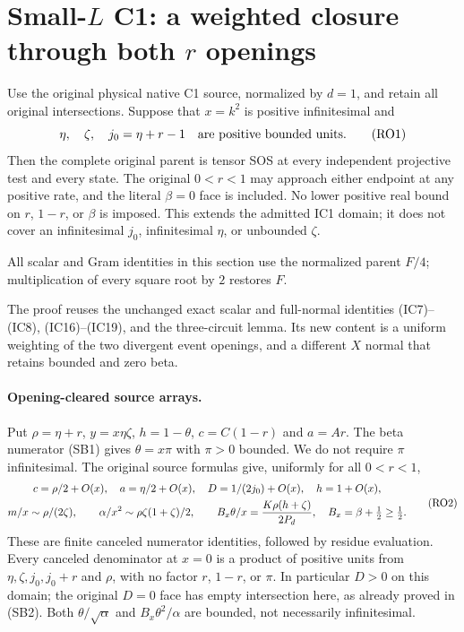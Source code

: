 \section{Small-$L$ C1: a weighted closure through both $r$ openings}
\label{sec:r13-c1-r-openings}

\begin{theorem}
Use the original physical native C1 source, normalized by $d=1$, and
retain all original intersections. Suppose that $x=k^2$ is positive
infinitesimal and
\[
 \eta,\quad\zeta,\quad j_0=\eta+r-1
       \quad\hbox{are positive bounded units}.                 \tag{RO1}
\]
Then the complete original parent is tensor SOS at every independent
projective test and every state. The original $0<r<1$ may approach
either endpoint at any positive rate, and the literal $\beta=0$ face
is included. No lower positive real bound on $r$, $1-r$, or $\beta$
is imposed. This extends the admitted IC1 domain; it does
not cover an infinitesimal $j_0$, infinitesimal $\eta$, or unbounded
$\zeta$.
\end{theorem}

All scalar and Gram identities in this section use the normalized
parent $F/4$; multiplication of every square root by $2$ restores $F$.

The proof reuses the unchanged exact scalar and full-normal identities
(IC7)--(IC8), (IC16)--(IC19), and the three-circuit lemma. Its new
content is a uniform weighting of the two divergent event openings,
and a different $X$ normal that retains bounded and zero beta.

\paragraph{Opening-cleared source arrays.}
Put $\rho=\eta+r$, $y=x\eta\zeta$, $h=1-\theta$,
$c=C(1-r)$ and $a=Ar$. The beta numerator (SB1) gives
$\theta=x\pi$ with $\pi>0$ bounded. We do not require $\pi$
infinitesimal. The original source formulas give, uniformly for
all $0<r<1$,
\[
\begin{gathered}
 c=\rho/2+O(x),\quad a=\eta/2+O(x),\quad
 D=1/(2j_0)+O(x),\quad h=1+O(x),\\
 m/x\sim\rho/(2\zeta),\qquad
 \alpha/x^2\sim\rho\zeta(1+\zeta)/2,\qquad
 B_x\theta/x={K\rho(h+\zeta)\over2P_d},\quad
 B_x=\beta+\tfrac12\ge\tfrac12.                      
\end{gathered} \tag{RO2}
\]
These are finite canceled numerator identities, followed by residue
evaluation. Every canceled denominator at $x=0$ is a product of
positive units from $\eta,\zeta,j_0,j_0+r$ and $\rho$, with no
factor $r$, $1-r$, or $\pi$. In particular $D>0$ on this domain;
the original $D=0$ face has empty intersection here, as already proved
in (SB2). Both $\theta/\sqrt\alpha$ and
$B_x\theta^2/\alpha$ are bounded, not necessarily infinitesimal.

